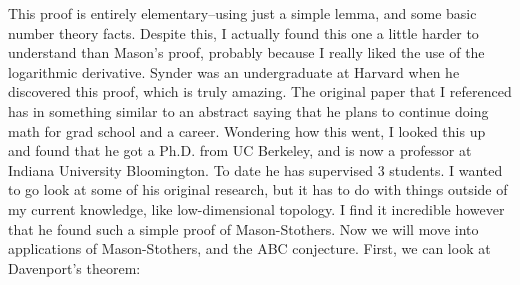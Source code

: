 \documentclass[12pt]{article}
\theoremstyle{definitionstyle}
\begin{document}
This proof is entirely elementary--using just a simple lemma, and some basic number theory facts. Despite this, I actually found this one a little harder to understand than Mason's proof, probably because I really liked the use of the logarithmic derivative. Synder was an undergraduate at Harvard when he discovered this proof, which is truly amazing. The original paper that I referenced has in something similar to an abstract saying that he plans to continue doing math for grad school and a career. Wondering how this went, I looked this up and found that he got a Ph.D. from UC Berkeley, and is now a professor at Indiana University Bloomington. To date he has supervised 3 students. I wanted to go look at some of his original research, but it has to do with things outside of my current knowledge, like low-dimensional topology. I find it incredible however that he found such a simple proof of Mason-Stothers. Now we will move into applications of Mason-Stothers, and the ABC conjecture. First, we can look at Davenport's theorem:
\end{document}
